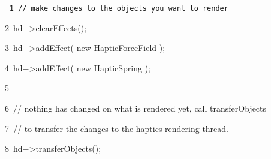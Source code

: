 {
\tt
{\hlstd }{\hlline \ \ \ \ 1\ }{\hlslc // make changes to the objects you want to render}\leavevmode\par
{\hlline \ \ \ \ 2\ }{\hlstd hd}{\hlsym $\mathord{-}$$\mathord{>}$}{\hlstd }{\hlkwd clearEffects}{\hlstd }{\hlsym ();}\leavevmode\par
{\hlline \ \ \ \ 3\ }{\hlstd hd}{\hlsym $\mathord{-}$$\mathord{>}$}{\hlstd }{\hlkwd addEffect}{\hlstd }{\hlsym ( }{\hlstd }{\hlkwa new }{\hlstd HapticForceField }{\hlsym );}\leavevmode\par
{\hlline \ \ \ \ 4\ }{\hlstd hd}{\hlsym $\mathord{-}$$\mathord{>}$}{\hlstd }{\hlkwd addEffect}{\hlstd }{\hlsym ( }{\hlstd }{\hlkwa new }{\hlstd HapticSpring }{\hlsym );}\leavevmode\par
{\hlline \ \ \ \ 5\ }{\hlstd }\leavevmode\par
{\hlline \ \ \ \ 6\ }{\hlslc // nothing has changed on what is rendered yet, call transferObjects}\leavevmode\par
{\hlline \ \ \ \ 7\ }{\hlstd }{\hlslc // to transfer the changes to the haptics rendering thread.}\leavevmode\par
{\hlline \ \ \ \ 8\ }{\hlstd hd}{\hlsym $\mathord{-}$$\mathord{>}$}{\hlstd }{\hlkwd transferObjects}{\hlstd }{\hlsym ();}{\hlstd }\leavevmode\par
}
